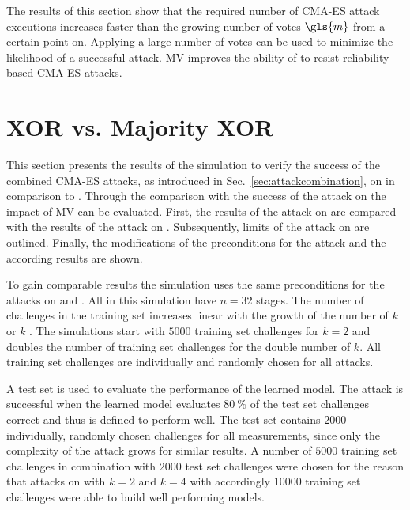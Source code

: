 The results of this section show that the required number of \ac{CMA-ES} attack executions increases faster than the growing number of votes $\gls{m}$ from a certain point on.
Applying a large number of votes can be used to minimize the likelihood of a successful attack.
\ac{MV} improves the ability of \apufs to resist reliability based \ac{CMA-ES} attacks.


\section{\acs{XOR} \apufs vs. Majority \acs{XOR} \apufs}
\label{sec:xorarbitervsmajorityxorarbiter}


This section presents the results of the simulation to verify the success of the combined \ac{CMA-ES} attacks, as introduced in Sec.\ \ref{sec:attackcombination}, on \mxpufs in comparison to \xpufs.
Through the comparison with the success of the attack on \xpuf the impact of \ac{MV} can be evaluated.
First, the results of the attack on \xpufs are compared with the results of the attack on \mxpufs.
Subsequently, limits of the attack on \mxpufs are outlined.
Finally, the modifications of the preconditions for the attack and the according results are shown.

To gain comparable results the simulation uses the same preconditions for the attacks on \xpufs and \mxpufs.
All \pufs in this simulation have $n = 32$ stages.
The number of challenges in the training set increases linear with the growth of the number of $k$ \apufs or $k$ \mpufs.
The simulations start with $5000$ training set challenges for $k = 2$ and doubles the number of training set challenges for the double number of $k$.
All training set challenges are individually and randomly chosen for all attacks.

A test set is used to evaluate the performance of the learned model.
The attack is successful when the learned model evaluates $80\ \%$ of the test set challenges correct and thus is defined to perform well.
The test set contains $2000$ individually, randomly chosen challenges for all measurements, since only the complexity of the attack grows for similar results.
A number of $5000$ training set challenges in combination with $2000$ test set challenges were chosen for the reason that attacks on \xpufs with $k = 2$ and $k = 4$ with accordingly $10000$ training set challenges were able to build well performing models.

